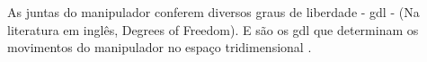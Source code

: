 \begin{figure}[!htb]
    \vspace{1.0em}
\label{fig:dag}
\end{figure}

As juntas do manipulador conferem diversos graus de liberdade - gdl - (Na literatura em inglês, Degrees of Freedom). E são os gdl que determinam os movimentos do manipulador no espaço tridimensional \cite{Santos2004}.

